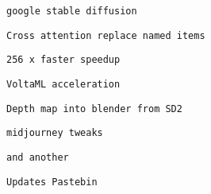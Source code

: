 \begin{verbatim}
google stable diffusion
\end{verbatim}
             

             
             
              \protect\hypertarget{ID_1450288175}{}{}

\begin{verbatim}
Cross attention replace named items
\end{verbatim}
             

             
             
              \protect\hypertarget{ID_1941523888}{}{}

\begin{verbatim}
256 x faster speedup
\end{verbatim}
             

             
             
              \protect\hypertarget{ID_168276559}{}{}

\begin{verbatim}
VoltaML acceleration
\end{verbatim}
             

             
             
              \protect\hypertarget{ID_1013855690}{}{}

\begin{verbatim}
Depth map into blender from SD2
\end{verbatim}
             

             
             
              \protect\hypertarget{ID_1446173393}{}{}

\begin{verbatim}
midjourney tweaks
\end{verbatim}

               
               
                \protect\hypertarget{ID_1448181416}{}{}

\begin{verbatim}
and another
\end{verbatim}
               
             

             
             
              \protect\hypertarget{ID_575155932}{}{}

\begin{verbatim}
Updates Pastebin
\end{verbatim}
             

